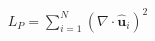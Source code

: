 \documentclass[preview]{standalone}
\begin{document}
\begin{align*}
L_P = \sum_{i=1}^N \left(\nabla \cdot \hat{\mathbf{u}}_i\right)^2
\end{align*}
\end{document}
